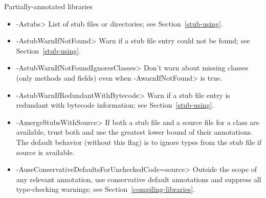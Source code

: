 Partially-annotated libraries
\begin{itemize}
\item \<-Astubs>
  List of stub files or directories; see Section~\ref{stub-using}.
\item \<-AstubWarnIfNotFound>
  Warn if a stub file entry could not be found; see Section~\ref{stub-using}.
\item \<-AstubWarnIfNotFoundIgnoresClasses>
  Don't warn about missing classes (only methods and fields) even when \<-AwarnIfNotFound> is true.
\item \<-AstubWarnIfRedundantWithBytecode>
  Warn if a stub file entry is redundant with bytecode information; see
  Section~\ref{stub-using}.
\item \<-AmergeStubsWithSource>
  If both a stub file and a source file for a class are available, trust
  both and use the greatest lower bound of their annotations. The default
  behavior (without this flag) is to ignore types from the stub file if
  source is available.
\item \<-AuseConservativeDefaultsForUncheckedCode=source>
  Outside the scope of any relevant
   annotation, use conservative
  default annotations and suppress all type-checking warnings; see
  Section~\ref{compiling-libraries}.
\end{itemize}

